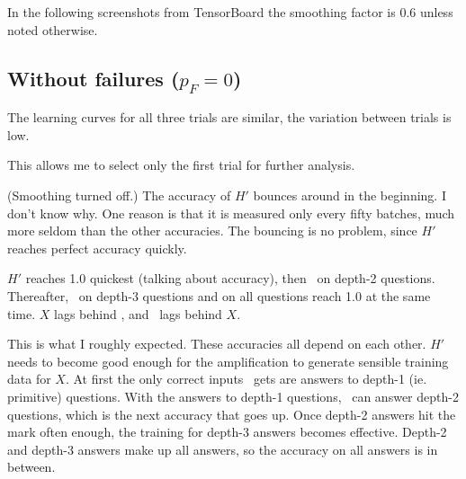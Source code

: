 \documentclass{farlamp}
\begin{document}
In the following screenshots from TensorBoard the smoothing factor is 0.6 unless
noted otherwise.

\subsection{Without failures ($p_F = 0$)}

\begin{LCRow}
\end{LCRow}

\Obs The learning curves for all three trials are similar, the variation between
trials is low.

\Disc This allows me to select only the first trial for further analysis.

\begin{LCRow}
\end{LCRow}

\Obs (Smoothing turned off.) The accuracy of $H'$ bounces around in the
beginning.
\Disc \OQ{}I don't know why. One reason is that it is measured only every fifty
batches, much more seldom than the other accuracies. The bouncing is no problem,
since $H'$ reaches perfect accuracy quickly.

\begin{LCRow}
\end{LCRow}

\Obs $H'$ reaches 1.0 quickest (talking about accuracy), then \AmpHp\ on depth-2
questions. Thereafter, \AmpHp\ on depth-3 questions and on all questions reach
1.0 at the same time. $X$ lags behind \AmpHp, and \Xpa\ lags behind $X$.

\Disc This is what I roughly expected. These accuracies all depend on each
other. $H'$ needs to become good enough for the amplification to generate
sensible training data for $X$. At first the only correct inputs \AmpHp\ gets
are answers to depth-1 (ie. primitive) questions. With the answers to depth-1
questions, \AmpHp\ can answer depth-2 questions, which is the next accuracy that
goes up. Once depth-2 answers hit the mark often enough, the training for
depth-3 answers becomes effective. Depth-2 and depth-3 answers make up all
answers, so the accuracy on all answers is in between.
\end{document}

